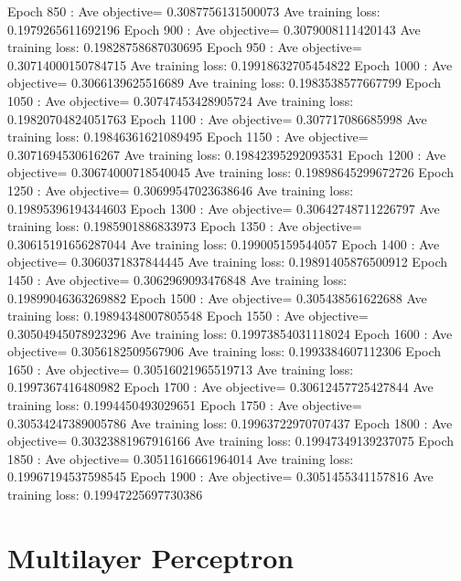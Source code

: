 \documentclass{article}
\theoremstyle{plain}
\theoremstyle{definition}
\begin{document}
\begin{enumerate}
Epoch  850 : Ave objective= 0.3087756131500073  Ave training loss:  0.1979265611692196
Epoch  900 : Ave objective= 0.3079008111420143  Ave training loss:  0.19828758687030695
Epoch  950 : Ave objective= 0.30714000150784715  Ave training loss:  0.19918632705454822
Epoch  1000 : Ave objective= 0.3066139625516689  Ave training loss:  0.1983538577667799
Epoch  1050 : Ave objective= 0.30747453428905724  Ave training loss:  0.19820704824051763
Epoch  1100 : Ave objective= 0.307717086685998  Ave training loss:  0.19846361621089495
Epoch  1150 : Ave objective= 0.3071694530616267  Ave training loss:  0.19842395292093531
Epoch  1200 : Ave objective= 0.30674000718540045  Ave training loss:  0.19898645299672726
Epoch  1250 : Ave objective= 0.30699547023638646  Ave training loss:  0.19895396194344603
Epoch  1300 : Ave objective= 0.30642748711226797  Ave training loss:  0.1985901886833973
Epoch  1350 : Ave objective= 0.30615191656287044  Ave training loss:  0.199005159544057
Epoch  1400 : Ave objective= 0.3060371837844445  Ave training loss:  0.19891405876500912
Epoch  1450 : Ave objective= 0.3062969093476848  Ave training loss:  0.19899046363269882
Epoch  1500 : Ave objective= 0.305438561622688  Ave training loss:  0.19894348007805548
Epoch  1550 : Ave objective= 0.30504945078923296  Ave training loss:  0.19973854031118024
Epoch  1600 : Ave objective= 0.3056182509567906  Ave training loss:  0.1993384607112306
Epoch  1650 : Ave objective= 0.30516021965519713  Ave training loss:  0.1997367416480982
Epoch  1700 : Ave objective= 0.30612457725427844  Ave training loss:  0.1994450493029651
Epoch  1750 : Ave objective= 0.30534247389005786  Ave training loss:  0.19963722970707437
Epoch  1800 : Ave objective= 0.30323881967916166  Ave training loss:  0.19947349139237075
Epoch  1850 : Ave objective= 0.30511616661964014  Ave training loss:  0.19967194537598545
Epoch  1900 : Ave objective= 0.3051455341157816  Ave training loss:  0.19947225697730386

\setcounter{saveenum}{\value{enumi}}
\end{enumerate}

\section{Multilayer Perceptron}
\end{document}
